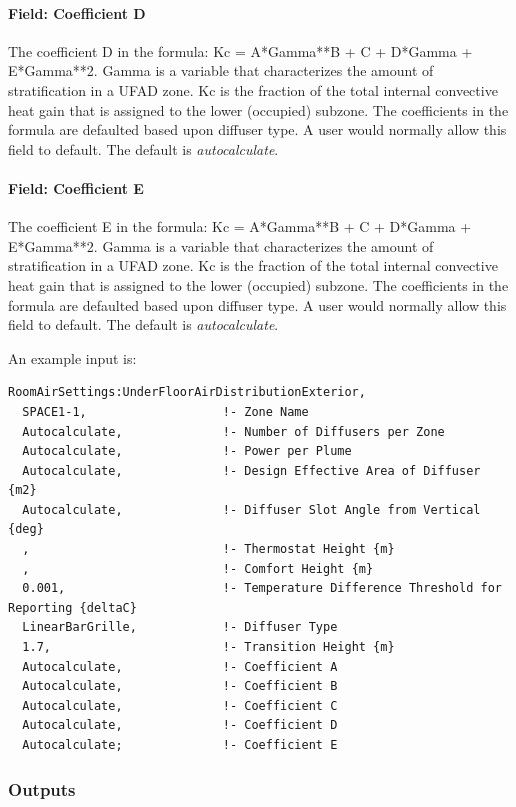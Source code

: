 \paragraph{Field: Coefficient D}\label{field-coefficient-d-1}

The coefficient D in the formula: Kc = A*Gamma**B + C + D*Gamma + E*Gamma**2. Gamma is a variable that characterizes the amount of stratification in a UFAD zone. Kc is the fraction of the total internal convective heat gain that is assigned to the lower (occupied) subzone. The coefficients in the formula are defaulted based upon diffuser type. A user would normally allow this field to default. The default is \emph{autocalculate}.

\paragraph{Field: Coefficient E}\label{field-coefficient-e-1}

The coefficient E in the formula: Kc = A*Gamma**B + C + D*Gamma + E*Gamma**2. Gamma is a variable that characterizes the amount of stratification in a UFAD zone. Kc is the fraction of the total internal convective heat gain that is assigned to the lower (occupied) subzone. The coefficients in the formula are defaulted based upon diffuser type. A user would normally allow this field to default. The default is \emph{autocalculate}.

An example input is:

\begin{lstlisting}
RoomAirSettings:UnderFloorAirDistributionExterior,
  SPACE1-1,                   !- Zone Name
  Autocalculate,              !- Number of Diffusers per Zone
  Autocalculate,              !- Power per Plume
  Autocalculate,              !- Design Effective Area of Diffuser {m2}
  Autocalculate,              !- Diffuser Slot Angle from Vertical {deg}
  ,                           !- Thermostat Height {m}
  ,                           !- Comfort Height {m}
  0.001,                      !- Temperature Difference Threshold for Reporting {deltaC}
  LinearBarGrille,            !- Diffuser Type
  1.7,                        !- Transition Height {m}
  Autocalculate,              !- Coefficient A
  Autocalculate,              !- Coefficient B
  Autocalculate,              !- Coefficient C
  Autocalculate,              !- Coefficient D
  Autocalculate;              !- Coefficient E
\end{lstlisting}

\subsubsection{Outputs}\label{roomairsettingsunderfloorairdistributionexterior-outputs}

